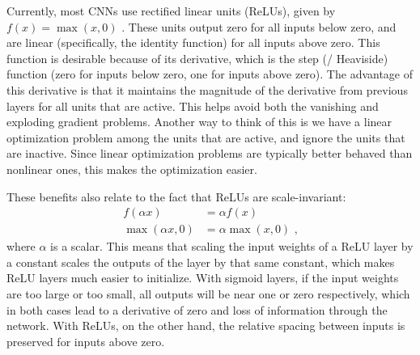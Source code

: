 Currently, most CNNs use rectified linear units (ReLUs),
given by $f(x) = \max(x, 0)$ \parencite{Nair2010}.
These units output zero for all inputs below zero,
and are linear (specifically, the identity function) for all inputs above zero.
This function is desirable because of its derivative,
which is the step (\aka/ Heaviside) function
(zero for inputs below zero, one for inputs above zero).
The advantage of this derivative is that it
maintains the magnitude of the derivative from previous layers
for all units that are active.
This helps avoid both the vanishing and exploding gradient problems.
Another way to think of this is we have a linear optimization problem
among the units that are active,
and ignore the units that are inactive.
Since linear optimization problems are typically better behaved than nonlinear ones,
this makes the optimization easier.

These benefits also relate to the fact that ReLUs are scale-invariant:
\begin{align}
  f(\alpha x) &= \alpha f(x) \nonumber\\
  \max(\alpha x, 0) &= \alpha \max(x, 0) \text{ ,}
\end{align}
where $\alpha$ is a scalar.
This means that scaling the input weights of a ReLU layer by a constant
scales the outputs of the layer by that same constant,
which makes ReLU layers much easier to initialize.
With sigmoid layers, if the input weights are too large or too small,
all outputs will be near one or zero respectively,
which in both cases lead to a derivative of zero
and loss of information through the network.
With ReLUs, on the other hand, the relative spacing between inputs
is preserved for inputs above zero.

